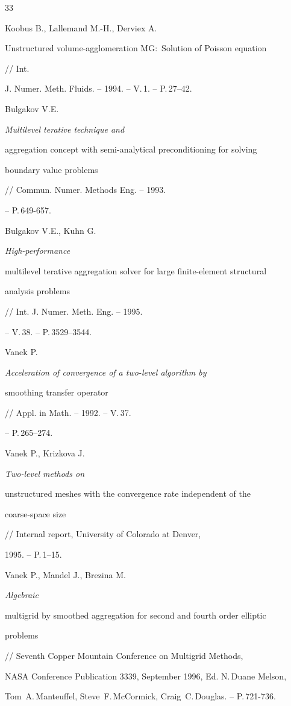 \begin{thebibliography}{33}
\bibitem{[19]} %


Koobus B., Lallemand M.-H., Derviex A. {\it


Unstructured volume-agglomeration MG$:$ Solution of Poisson equation} // Int.


J. Numer. Meth. Fluids. -- 1994. -- V.\,1. -- P.\,27--42.


\bibitem{[7]} %


Bulgakov V.E. {\it Multilevel terative technique and


aggregation concept with semi-analytical preconditioning for solving


boundary value problems} // Commun. Numer. Methods Eng. -- 1993.


-- P.\,649-657.


\bibitem{[8]} %


Bulgakov V.E., Kuhn G. {\it High-performance


multilevel terative aggregation solver for large finite-element structural


analysis problems} // Int. J. Numer. Meth. Eng. -- 1995.


-- V.\,38. -- P.\,3529--3544.


\bibitem{[28]} %


Vanek P. {\it Acceleration of convergence of a two-level algorithm by


smoothing transfer operator} // Appl. in Math. -- 1992. -- V.\,37.


-- P.\,265--274.


\bibitem{[29]} %


Vanek P., Krizkova J. {\it Two-level methods on


unstructured meshes with the convergence rate independent of the


coarse-space size} // Internal report, University of Colorado at Denver,


1995. -- P.\,1--15.


\bibitem{[30]} %


Vanek P., Mandel J., Brezina M. {\it Algebraic


multigrid by smoothed aggregation for second and fourth order elliptic


problems} // Seventh Copper Mountain Conference on Multigrid Methods,


NASA Conference Publication 3339, September 1996, Ed. N.\,Duane Melson,


Tom~A.\,Manteuffel, Steve~F.\,McCormick, Craig~C.\,Douglas. -- P.\,721-736.



\end{thebibliography}
